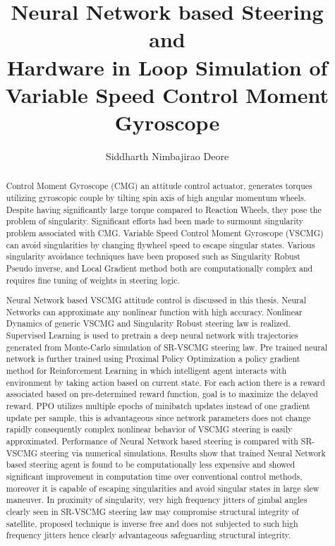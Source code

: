 \documentclass[english,oneside,LaM,binding=0.6cm]{sapthesis}
\title{Neural Network based Steering and \\ Hardware in Loop Simulation of Variable Speed Control Moment Gyroscope}
\author{Siddharth Nimbajirao Deore}
\begin{document}
\frontmatter
\maketitle
\dedication{Dedicated to mother Usha and father N. Z. Deore}

\begin{abstract}
{}
Control Moment Gyroscope (CMG) an attitude control actuator, generates torques utilizing gyroscopic couple by tilting spin axis of high angular momentum wheels. Despite having significantly large torque compared to Reaction Wheels, they pose the problem of singularity. Significant efforts had been made to surmount singularity problem associated with CMG. Variable Speed Control Moment Gyroscope (VSCMG) can avoid singularities by changing flywheel speed to escape singular states. Various singularity avoidance techniques have been proposed such as Singularity Robust Pseudo inverse, and Local Gradient method both are computationally complex and requires fine tuning of weights in steering logic. 

Neural Network based VSCMG attitude control is discussed in this thesis. Neural Networks can approximate any nonlinear function with high accuracy. Nonlinear Dynamics of generic VSCMG and Singularity Robust steering law is realized. Supervised Learning is used to pretrain a deep neural network with trajectories generated from Monte-Carlo simulation of SR-VSCMG steering law. Pre trained neural network is further trained using Proximal Policy Optimization a policy gradient method for Reinforcement Learning in which intelligent agent interacts with environment by taking action based on current state. For each action there is a reward associated based on pre-determined reward function, goal is to maximize the delayed reward. PPO utilizes multiple epochs of minibatch updates instead of one gradient update per sample, this is advantageous since network parameters does not change rapidly consequently complex nonlinear behavior of VSCMG steering is easily approximated. Performance of Neural Network based steering is compared with SR-VSCMG steering via numerical simulations. Results show that trained Neural Network based steering agent is found to be computationally less expensive  and showed significant improvement in computation time over conventional control methods, moreover it is capable of escaping singularities and avoid singular states in large slew maneuver. In proximity of singularity, very high frequency jitters of gimbal angles clearly seen in SR-VSCMG steering law may compromise structural integrity of satellite, proposed technique is inverse free and does not subjected to such high frequency jitters hence clearly advantageous safeguarding structural integrity.


\end{abstract}
\end{document}
